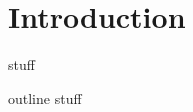 \ifarxiv \clearpage \fi
\newcommand{\introSec}{Introduction}
\section{\introSec} 
\label{sec:intro}

stuff
\vspace{-2px}

\newcommand{\contribution}[2]{\paragraph{#1. #2}} 

outline stuff